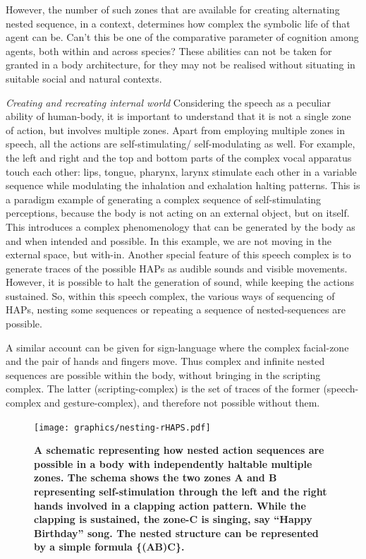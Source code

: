 {{{{{However, the number of such zones that are available for creating alternating nested sequence, in a context, determines how complex the symbolic life of that agent can be. Can't this be one of the comparative parameter of cognition among agents, both within and across species? These abilities can not be taken for granted in a body architecture, for they may not be realised without situating in suitable social and natural contexts. 

\emph{Creating and recreating internal world} Considering the speech as a peculiar ability of human-body, it is important to understand that it is not a single zone of action, but involves multiple zones. Apart from employing multiple zones in speech, all the actions are self-stimulating/ self-modulating as well. For example, the left and right and the top and bottom parts of the complex vocal apparatus touch each other: lips, tongue, pharynx, larynx stimulate each other in a variable sequence while modulating the inhalation and exhalation halting patterns. This is a paradigm example of generating a complex sequence of self-stimulating perceptions, because the body is not acting on an external object, but on itself. This introduces a complex phenomenology that can be generated by the body as and when intended and possible. In this example, we are not moving in the external space, but with-in. Another special feature of this speech complex is to generate traces of the possible HAPs as audible sounds and visible movements. However, it is possible to halt the generation of sound, while keeping the actions sustained. So, within this speech complex, the various ways of sequencing of HAPs, nesting some sequences or repeating a sequence of nested-sequences are possible. 

A similar account can be given for sign-language where the complex facial-zone and the pair of hands and fingers move. Thus complex and infinite nested sequences are possible within the body, without bringing in the scripting complex. The latter (scripting-complex) is the set of traces of the former (speech-complex and gesture-complex), and therefore not possible without them. 
 
\begin{figure}[ht] 
\texttt{[image: graphics/nesting-rHAPS.pdf]}
\caption{\textbf{A schematic representing how nested action sequences are possible in a body with independently haltable multiple zones. The schema shows the two zones A and B representing self-stimulation through the left and the right hands involved in a clapping action pattern. While the clapping is sustained, the zone-C is singing, say ``Happy Birthday'' song. The nested structure can be represented by a simple formula \{(AB)C\}. }}
\label{nesting}
\end{figure}

}}}}}
